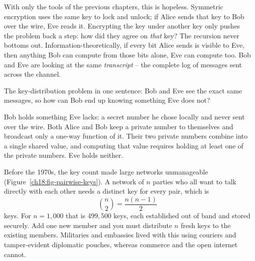 With only the tools of the previous chapters, this is hopeless. Symmetric encryption uses the same key to lock and unlock; if Alice sends that key to Bob over the wire, Eve reads it. Encrypting the key under another key only pushes the problem back a step: how did they agree on \emph{that} key? The recursion never bottoms out. Information-theoretically, if every bit Alice sends is visible to Eve, then anything Bob can compute from those bits alone, Eve can compute too. Bob and Eve are looking at the same \emph{transcript} -- the complete log of messages sent across the channel.

\begin{intuitionbox}
The key-distribution problem in one sentence: Bob and Eve see the exact same messages, so how can Bob end up knowing something Eve does not?

Bob holds something Eve lacks: a secret number he chose locally and never sent over the wire. Both Alice and Bob keep a private number to themselves and broadcast only a one-way function of it. Their two private numbers combine into a single shared value, and computing that value requires holding at least one of the private numbers. Eve holds neither.
\end{intuitionbox}

Before the 1970s, the key count made large networks unmanageable (Figure~\ref{ch18:fig-pairwise-keys}). A network of $n$ parties who all want to talk directly with each other needs a distinct key for every pair, which is
\[
  \binom{n}{2} = \frac{n(n-1)}{2}
\]
keys. For $n = 1{,}000$ that is $499{,}500$ keys, each established out of band and stored securely. Add one new member and you must distribute $n$ fresh keys to the existing members. Militaries and embassies lived with this using couriers and tamper-evident diplomatic pouches, whereas commerce and the open internet cannot.

